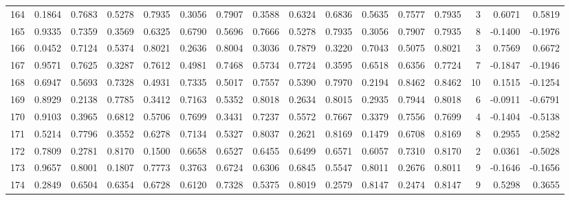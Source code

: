 \begin{tabular}{lrrrrrrrrrrrrrrr}
164 &      0.1864 &  0.7683 &  0.5278 &  0.7935 &  0.3056 &  0.7907 &  0.3588 &  0.6324 &  0.6836 &  0.5635 &   0.7577 &     0.7935 &      3 &                    0.6071 &                     0.5819 \\
165 &      0.9335 &  0.7359 &  0.3569 &  0.6325 &  0.6790 &  0.5696 &  0.7666 &  0.5278 &  0.7935 &  0.3056 &   0.7907 &     0.7935 &      8 &                   -0.1400 &                    -0.1976 \\
166 &      0.0452 &  0.7124 &  0.5374 &  0.8021 &  0.2636 &  0.8004 &  0.3036 &  0.7879 &  0.3220 &  0.7043 &   0.5075 &     0.8021 &      3 &                    0.7569 &                     0.6672 \\
167 &      0.9571 &  0.7625 &  0.3287 &  0.7612 &  0.4981 &  0.7468 &  0.5734 &  0.7724 &  0.3595 &  0.6518 &   0.6356 &     0.7724 &      7 &                   -0.1847 &                    -0.1946 \\
168 &      0.6947 &  0.5693 &  0.7328 &  0.4931 &  0.7335 &  0.5017 &  0.7557 &  0.5390 &  0.7970 &  0.2194 &   0.8462 &     0.8462 &     10 &                    0.1515 &                    -0.1254 \\
169 &      0.8929 &  0.2138 &  0.7785 &  0.3412 &  0.7163 &  0.5352 &  0.8018 &  0.2634 &  0.8015 &  0.2935 &   0.7944 &     0.8018 &      6 &                   -0.0911 &                    -0.6791 \\
170 &      0.9103 &  0.3965 &  0.6812 &  0.5706 &  0.7699 &  0.3431 &  0.7237 &  0.5572 &  0.7667 &  0.3379 &   0.7556 &     0.7699 &      4 &                   -0.1404 &                    -0.5138 \\
171 &      0.5214 &  0.7796 &  0.3552 &  0.6278 &  0.7134 &  0.5327 &  0.8037 &  0.2621 &  0.8169 &  0.1479 &   0.6708 &     0.8169 &      8 &                    0.2955 &                     0.2582 \\
172 &      0.7809 &  0.2781 &  0.8170 &  0.1500 &  0.6658 &  0.6527 &  0.6455 &  0.6499 &  0.6571 &  0.6057 &   0.7310 &     0.8170 &      2 &                    0.0361 &                    -0.5028 \\
173 &      0.9657 &  0.8001 &  0.1807 &  0.7773 &  0.3763 &  0.6724 &  0.6306 &  0.6845 &  0.5547 &  0.8011 &   0.2676 &     0.8011 &      9 &                   -0.1646 &                    -0.1656 \\
174 &      0.2849 &  0.6504 &  0.6354 &  0.6728 &  0.6120 &  0.7328 &  0.5375 &  0.8019 &  0.2579 &  0.8147 &   0.2474 &     0.8147 &      9 &                    0.5298 &                     0.3655 \\

\end{tabular}

